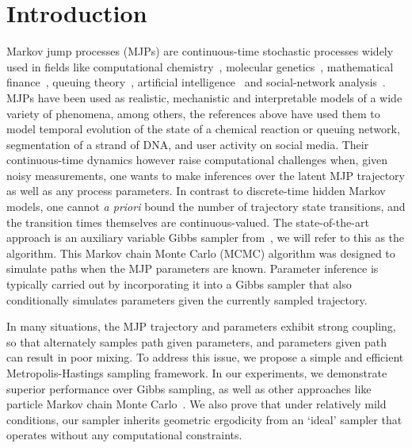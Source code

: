 
\section{Introduction}
\label{sec:intro}
Markov jump processes (MJPs) are continuous-time stochastic processes widely used in fields like computational chemistry~\citep{gillespie97}, molecular genetics~\citep{FearnSher2006}, mathematical finance~\citep{Elliott06}, queuing theory~\citep{Breuer2003}, artificial intelligence~\citep{XuShe10} and social-network analysis~\citep{pan2016markov}. 
MJPs have been used as realistic, mechanistic and interpretable models of a wide variety of phenomena, among others, the references above have used them to model temporal evolution of the state of a chemical reaction or queuing network, segmentation of a strand of DNA, and user activity on social media.
Their continuous-time dynamics however raise computational challenges when, given noisy measurements, one wants to make inferences 
over the latent MJP trajectory as well as any process parameters. 
In contrast to {discrete-time} hidden Markov models, one cannot 
{\em a priori} bound the number of trajectory state transitions, and the transition times themselves are continuous-valued. 
The state-of-the-art approach is an auxiliary variable Gibbs sampler from~\cite{RaoTeh13}, we will refer to this as the {\algname} algorithm. 
This Markov chain Monte Carlo (MCMC) algorithm was designed to simulate paths when the MJP parameters are known. 
Parameter inference is typically carried out by incorporating it into a Gibbs sampler that also conditionally simulates parameters given the currently sampled trajectory. 

In many situations, the MJP trajectory and parameters exhibit strong coupling, so that alternately samples path given parameters, and parameters given path can result in poor mixing.  
To address this issue, we propose a simple and efficient Metropolis-Hastings sampling framework. 
In our experiments, we demonstrate superior performance over Gibbs sampling, as well as other approaches like particle Markov chain Monte Carlo~\citep{Andrieu10}. 
We also prove that under relatively mild conditions, our sampler inherits geometric ergodicity from an `ideal' sampler that operates without any computational constraints.

